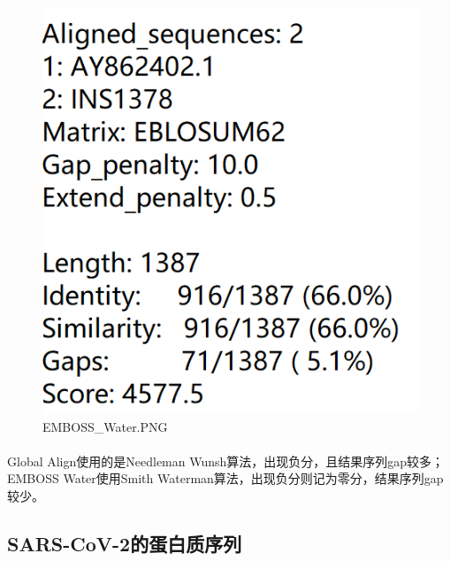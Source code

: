 \documentclass[supercite]{HustGraduPaper}
\begin{document}
		\begin{figure}[H]
			\centering
			\includegraphics[width=1\textwidth]{./material/practice2/emboss_water.png}
			\caption{EMBOSS\_Water.PNG}
		\end{figure}
		\paragraph{}\label{subpara:subpara}Global Align使用的是Needleman Wunsh算法，出现负分，且结果序列gap较多；EMBOSS Water使用Smith Waterman算法，出现负分则记为零分，结果序列gap较少。
	\subsection{SARS-CoV-2的蛋白质序列}
\end{document}
